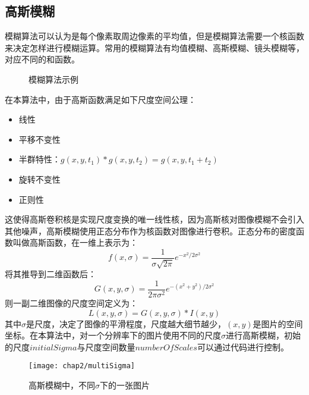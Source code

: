     \subsection{高斯模糊}
      模糊算法可以认为是每个像素取周边像素的平均值，但是模糊算法需要一个核函数来决定怎样进行模糊运算。常用的模糊算法有均值模糊、高斯模糊、镜头模糊等，对应不同的和函数。
      \begin{figure}[!htp]
        \centering
        \hspace{1cm}
        \hspace{1cm}
        \caption{模糊算法示例}
      \end{figure}
      在本算法中，由于高斯函数满足如下尺度空间公理：
      \begin{itemize}
        \item 线性
        \item 平移不变性
        \item 半群特性：$g(x,y,t_1)*g(x,y,t_2)=g(x,y,t_1+t_2)$
        \item 旋转不变性
        \item 正则性
      \end{itemize}
      这使得高斯卷积核是实现尺度变换的唯一线性核，因为高斯核对图像模糊不会引入其他噪声，高斯模糊使用正态分布作为核函数对图像进行卷积。正态分布的密度函数叫做高斯函数，在一维上表示为：
      \begin{equation}
        f(x,\sigma)=\frac{1}{\sigma\sqrt{2\pi}}e^{-x^{2}/2\sigma^2}
      \end{equation}
      将其推导到二维函数后：
      \begin{equation}
        G(x,y,\sigma)=\frac{1}{2\pi\sigma^2}e^{-(x^2+y^2)/2\sigma^2}
      \end{equation}
      则一副二维图像的尺度空间定义为：
      \begin{equation}
        L(x,y,\sigma)=G(x,y,\sigma)*I(x,y)
      \end{equation}
      其中$\sigma$是尺度，决定了图像的平滑程度，尺度越大细节越少，$(x,y)$是图片的空间坐标。在本算法中，对一个分辨率下的图片使用不同的尺度$\sigma$进行高斯模糊，初始的尺度$initialSigma$与尺度空间数量$numberOfScales$可以通过代码进行控制。
      \begin{figure}[htp]
        \centering
        \texttt{[image: chap2/multiSigma]}
        \caption{高斯模糊中，不同$\sigma$下的一张图片}
      \end{figure}
